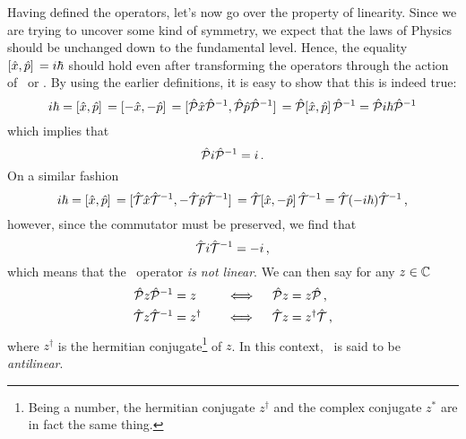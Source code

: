         Having defined the operators, let's now go over the property of linearity. Since we are trying to uncover some kind of symmetry, we expect that the laws of Physics should be unchanged down to the fundamental level. Hence, the equality $\comm*{\hx}{\hp} = i \hbar$ should hold even after transforming the operators through the action of \hP\ or \hT. By using the earlier definitions, it is easy to show that this is indeed true:
        \begin{equation*}
            i \hbar = \comm*{\hx}{\hp} = \comm*{-\hx}{-\hp} = \comm*{\hP \hx \hP^{-1}}{\hP \hp \hP^{-1}} = \hP \comm*{\hx}{\hp} \hP^{-1} = \hP i \hbar \hP^{-1}
        \end{equation*}
        which implies that
        \begin{equation}
            \label{eq:PiP}
            \mathcal{\hat{P}} i \mathcal{\hat{P}}^{-1} = i
            \,\text{.}
        \end{equation}
        On a similar fashion
        \begin{equation*}
            i \hbar = \comm*{\hx}{\hp} = \comm*{\hT \hx \hT^{-1}}{-\hT \hp \hT^{-1}} = \hT \comm*{\hx}{-\hp} \hT^{-1} = \hT \pqty{-i \hbar} \hT^{-1}
            \mycomma
        \end{equation*}
        however, since the commutator must be preserved, we find that
        \begin{equation}
            \label{eq:TiT}
            \mathcal{\hat{T}} i \mathcal{\hat{T}}^{-1} = -i
            \,\text{,}
        \end{equation}
        which means that the \hT\ operator \emph{is not linear}. We can then say for any $z \in \mathbb{C}$ 
        \begin{alignat}{3}
            \label{eq:P-linear}
            \mathcal{\hat{P}} z \mathcal{\hat{P}}^{-1} &= z        
            &\quad\iff\quad 
            \mathcal{\hat{P}} z &= z \mathcal{\hat{P}}
            \,\text{,}
            \\
            \label{eq:T-antilinear}
            \mathcal{\hat{T}} z \mathcal{\hat{T}}^{-1} &= z^{\dag} 
            &\quad\iff\quad 
            \mathcal{\hat{T}} z &= z^{\dag} \mathcal{\hat{T}}
            \,\text{,}
        \end{alignat}
        where $z^\dag$ is the hermitian conjugate\footnote{Being a number, the hermitian conjugate $z^\dag$ and the complex conjugate $z^*$ are in fact the same thing.} of $z$. In this context, \hT\ is said to be \emph{antilinear}.

